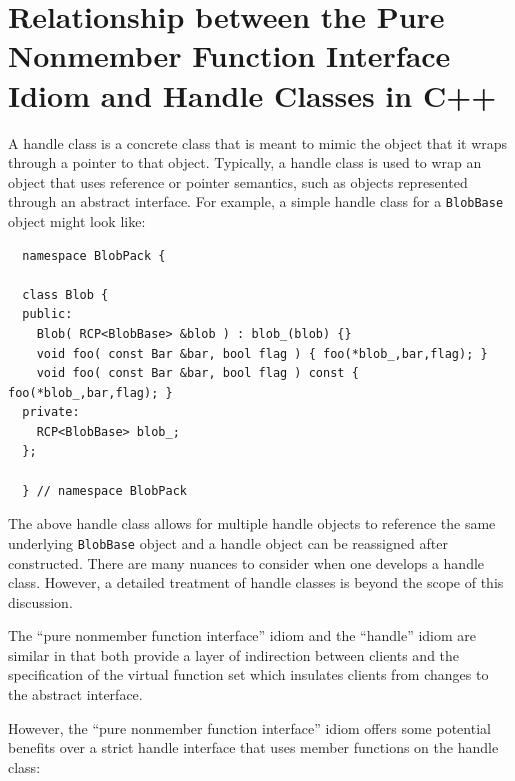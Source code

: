 \documentclass[pdf,ps2pdf,11pt]{SANDreport}
\begin{document}
%
\section{Relationship between the Pure Nonmember Function Interface Idiom and Handle Classes in C++}
%

A handle class is a concrete class that is meant to mimic the object that it
wraps through a pointer to that object.  Typically, a handle class is used to
wrap an object that uses reference or pointer semantics, such as objects
represented through an abstract interface.  For example, a simple handle class
for a {}\texttt{BlobBase} object might look like:

{\small\begin{verbatim}
  namespace BlobPack {

  class Blob {
  public:
    Blob( RCP<BlobBase> &blob ) : blob_(blob) {}
    void foo( const Bar &bar, bool flag ) { foo(*blob_,bar,flag); }
    void foo( const Bar &bar, bool flag ) const { foo(*blob_,bar,flag); }
  private:
    RCP<BlobBase> blob_;
  };

  } // namespace BlobPack
\end{verbatim}}

The above handle class allows for multiple handle objects to reference the
same underlying {}\texttt{BlobBase} object and a handle object can be
reassigned after constructed.  There are many nuances to consider when one
develops a handle class.  However, a detailed treatment of handle classes is
beyond the scope of this discussion.

The ``pure nonmember function interface'' idiom and the ``handle'' idiom are
similar in that both provide a layer of indirection between clients and the
specification of the virtual function set which insulates clients from changes
to the abstract interface.

However, the ``pure nonmember function interface'' idiom offers some potential
benefits over a strict handle interface that uses member functions on the
handle class:
\end{document}
